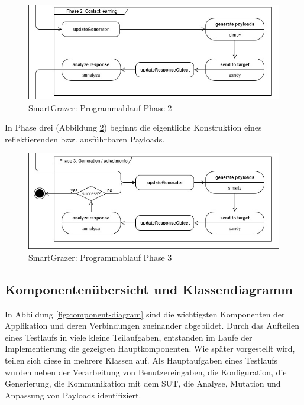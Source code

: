 \begin{figure}[htbp] 
	\centering
	\includegraphics[width=.95\textwidth]{contents/images/SmartGrazerWorkflowPhase2}
	\caption{SmartGrazer: Programmablauf Phase 2}
	\label{fig:SmartGrazer-workflow-phase2}
\end{figure}

\FloatBarrier

In Phase drei (Abbildung \ref{fig:SmartGrazer-workflow-phase3}) beginnt die eigentliche Konstruktion eines reflektierenden bzw. ausführbaren Payloads.

\begin{figure}[htbp] 
	\centering
	\includegraphics[width=.95\textwidth]{contents/images/SmartGrazerWorkflowPhase3}
	\caption{SmartGrazer: Programmablauf Phase 3}
	\label{fig:SmartGrazer-workflow-phase3}
\end{figure}

\FloatBarrier

\subsection{Komponentenübersicht und Klassendiagramm}\label{ssec:components}

In Abbildung \ref{fig:component-diagram} sind die wichtigsten Komponenten der Applikation und deren Verbindungen zueinander abgebildet. Durch das Aufteilen eines Testlaufs in viele kleine Teilaufgaben, entstanden im Laufe der Implementierung die gezeigten Hauptkomponenten. Wie später vorgestellt wird, teilen sich diese in mehrere Klassen auf. Als Hauptaufgaben eines Testlaufs wurden neben der Verarbeitung von Benutzereingaben, die Konfiguration, die Generierung, die Kommunikation mit dem SUT, die Analyse, Mutation und Anpassung von Payloads identifiziert.

